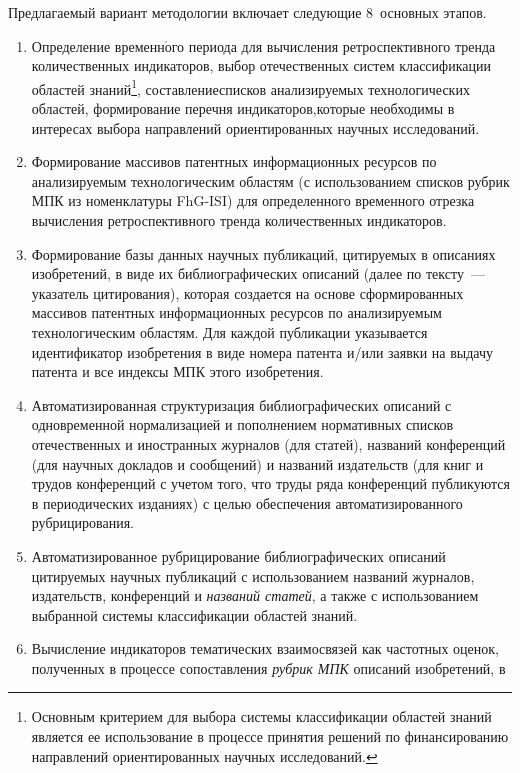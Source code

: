 \begin{multicols}{2}
  Предлагаемый вариант методологии включает следующие 8~основных этапов.
  \begin{enumerate}[1.]
\item Определение временн$\acute{\mbox{о}}$го периода для вы\-чис\-ле\-ния ретроспективного тренда количественных индикаторов, 
выбор отечественных систем классификации областей знаний\footnote{Основным критерием для выбора 
системы классификации областей знаний является ее использование в процессе принятия решений по 
финансированию направлений ориентированных научных исследований.}, составление\linebreak списков 
анализируемых технологических об\-ластей, формирование перечня индикаторов,\linebreak которые необходимы в интересах 
выбора на\-прав\-ле\-ний ориентированных научных исследований.
\item Формирование массивов патентных информационных ресурсов по анализируемым 
технологическим областям (с использованием списков рубрик МПК из номенклатуры 
FhG-ISI) для определенного временного отрезка вычисления ретроспективного тренда 
количественных индикаторов.
\item Формирование базы данных научных публикаций, цитируемых в описаниях 
изобретений, в виде их библиографических описаний (далее по тексту~--- указатель 
цитирования), которая создается на основе сформированных массивов патентных 
информационных ресурсов по анализируемым технологическим областям. Для каждой 
публикации указывается идентификатор изобретения в виде номера патента и/или заявки 
на выдачу патента и все индексы МПК этого изобретения.
\item Автоматизированная структуризация библиографических описаний с 
одновременной нормализацией и пополнением нормативных списков отечественных и 
иностранных журналов (для статей), названий конференций (для научных докладов и 
сообщений) и названий издательств (для книг и трудов конференций с учетом того, что 
труды ряда конференций пуб\-ли\-ку\-ют\-ся в периодических изданиях) с целью обеспечения 
автоматизированного рубрицирования.
\item Автоматизированное рубрицирование библиографических описаний цитируемых 
научных публикаций с использованием названий журналов, издательств, конференций и 
\textit{названий статей}, а также с использованием выбранной системы классификации 
областей знаний.
\item Вычисление индикаторов тематических взаимосвязей как частотных оценок, 
полученных в процессе сопоставления \textit{рубрик МПК} описаний изобретений, в 

\end{enumerate}
\end{multicols}
